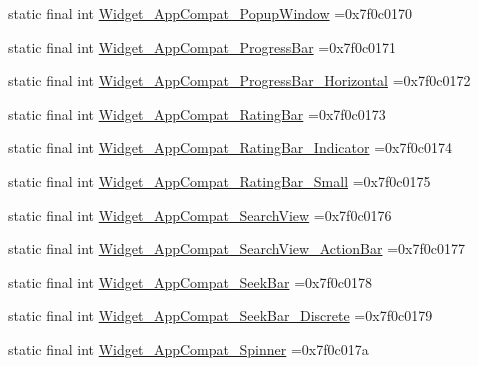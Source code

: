 \begin{DoxyCompactItemize}
\item 
static final int \mbox{\hyperlink{classbr_1_1unb_1_1cic_1_1mp_1_1marketmaster_1_1test_1_1R_1_1style_a1048b9fa010448f7cbfe1c3c2b096e72}{Widget\+\_\+\+App\+Compat\+\_\+\+Popup\+Window}} =0x7f0c0170
\item 
static final int \mbox{\hyperlink{classbr_1_1unb_1_1cic_1_1mp_1_1marketmaster_1_1test_1_1R_1_1style_ac279c1d1c1ac160ed41c1d1ce3e2f0c4}{Widget\+\_\+\+App\+Compat\+\_\+\+Progress\+Bar}} =0x7f0c0171
\item 
static final int \mbox{\hyperlink{classbr_1_1unb_1_1cic_1_1mp_1_1marketmaster_1_1test_1_1R_1_1style_a49527bed8170cf10bc49122e33baf0f0}{Widget\+\_\+\+App\+Compat\+\_\+\+Progress\+Bar\+\_\+\+Horizontal}} =0x7f0c0172
\item 
static final int \mbox{\hyperlink{classbr_1_1unb_1_1cic_1_1mp_1_1marketmaster_1_1test_1_1R_1_1style_a951196d728c5d9dac276ede4089dd0c0}{Widget\+\_\+\+App\+Compat\+\_\+\+Rating\+Bar}} =0x7f0c0173
\item 
static final int \mbox{\hyperlink{classbr_1_1unb_1_1cic_1_1mp_1_1marketmaster_1_1test_1_1R_1_1style_a28e222b8e31fece0082eb94853b857e2}{Widget\+\_\+\+App\+Compat\+\_\+\+Rating\+Bar\+\_\+\+Indicator}} =0x7f0c0174
\item 
static final int \mbox{\hyperlink{classbr_1_1unb_1_1cic_1_1mp_1_1marketmaster_1_1test_1_1R_1_1style_a7682b924e0e828eef7941b19f8c954a5}{Widget\+\_\+\+App\+Compat\+\_\+\+Rating\+Bar\+\_\+\+Small}} =0x7f0c0175
\item 
static final int \mbox{\hyperlink{classbr_1_1unb_1_1cic_1_1mp_1_1marketmaster_1_1test_1_1R_1_1style_ac2fb62a306acfa5301ff19f56d0b97da}{Widget\+\_\+\+App\+Compat\+\_\+\+Search\+View}} =0x7f0c0176
\item 
static final int \mbox{\hyperlink{classbr_1_1unb_1_1cic_1_1mp_1_1marketmaster_1_1test_1_1R_1_1style_a3ddfb0045affadb2c7b88fb9610f46c5}{Widget\+\_\+\+App\+Compat\+\_\+\+Search\+View\+\_\+\+Action\+Bar}} =0x7f0c0177
\item 
static final int \mbox{\hyperlink{classbr_1_1unb_1_1cic_1_1mp_1_1marketmaster_1_1test_1_1R_1_1style_a0a9976352dae1925eb7f0c24bbab9665}{Widget\+\_\+\+App\+Compat\+\_\+\+Seek\+Bar}} =0x7f0c0178
\item 
static final int \mbox{\hyperlink{classbr_1_1unb_1_1cic_1_1mp_1_1marketmaster_1_1test_1_1R_1_1style_aa0847bde3199041af5e9d370073286ac}{Widget\+\_\+\+App\+Compat\+\_\+\+Seek\+Bar\+\_\+\+Discrete}} =0x7f0c0179
\item 
static final int \mbox{\hyperlink{classbr_1_1unb_1_1cic_1_1mp_1_1marketmaster_1_1test_1_1R_1_1style_ad4681089733a68db656cb76afac1a522}{Widget\+\_\+\+App\+Compat\+\_\+\+Spinner}} =0x7f0c017a

\end{DoxyCompactItemize}
